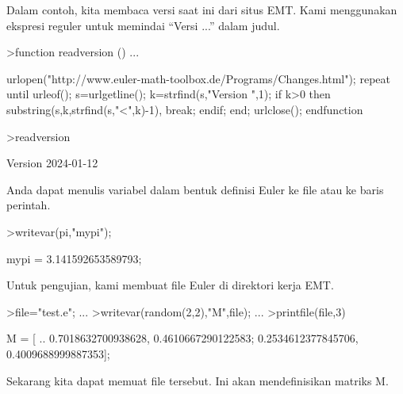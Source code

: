 \documentclass[a4paper,10pt]{article}
\begin{document}
\begin{eulernotebook}
\begin{eulercomment}
\begin{eulercomment}
\begin{eulercomment}
\begin{eulercomment}
\begin{eulercomment}
\begin{eulercomment}
\begin{eulercomment}
\begin{eulercomment}
\begin{eulercomment}
\begin{eulercomment}
\begin{eulercomment}
\begin{eulercomment}
\begin{eulercomment}
\begin{eulercomment}
\begin{eulercomment}
\begin{eulercomment}
\begin{eulercomment}
\begin{eulercomment}
\begin{eulercomment}
\begin{eulercomment}
\begin{eulercomment}
\begin{eulercomment}
\begin{eulercomment}
\begin{eulercomment}
\begin{eulercomment}
Dalam contoh, kita membaca versi saat ini dari situs EMT. Kami
menggunakan ekspresi reguler untuk memindai “Versi ...” dalam judul.
\end{eulercomment}
\begin{eulerprompt}
>function readversion () ...
\end{eulerprompt}
\begin{eulerudf}
  urlopen("http://www.euler-math-toolbox.de/Programs/Changes.html");
  repeat
    until urleof();
    s=urlgetline();
    k=strfind(s,"Version ",1);
    if k>0 then substring(s,k,strfind(s,"<",k)-1), break; endif;
  end;
  urlclose();
  endfunction
\end{eulerudf}
\begin{eulerprompt}
>readversion
\end{eulerprompt}
\begin{euleroutput}
  Version 2024-01-12
\end{euleroutput}
\begin{eulercomment}
Anda dapat menulis variabel dalam bentuk definisi Euler ke file atau
ke baris perintah.
\end{eulercomment}
\begin{eulerprompt}
>writevar(pi,"mypi");
\end{eulerprompt}
\begin{euleroutput}
  mypi = 3.141592653589793;
\end{euleroutput}
\begin{eulercomment}
Untuk pengujian, kami membuat file Euler di direktori kerja EMT.
\end{eulercomment}
\begin{eulerprompt}
>file="test.e"; ...
>writevar(random(2,2),"M",file); ...
>printfile(file,3)
\end{eulerprompt}
\begin{euleroutput}
  M = [ ..
  0.7018632700938628, 0.4610667290122583;
  0.2534612377845706, 0.4009688999887353];
\end{euleroutput}
\begin{eulercomment}
Sekarang kita dapat memuat file tersebut. Ini akan mendefinisikan
matriks M.
\end{eulercomment}
\begin{eulerprompt}

\end{eulerprompt}
\end{eulercomment}
\end{eulercomment}
\end{eulercomment}
\end{eulercomment}
\end{eulercomment}
\end{eulercomment}
\end{eulercomment}
\end{eulercomment}
\end{eulercomment}
\end{eulercomment}
\end{eulercomment}
\end{eulercomment}
\end{eulercomment}
\end{eulercomment}
\end{eulercomment}
\end{eulercomment}
\end{eulercomment}
\end{eulercomment}
\end{eulercomment}
\end{eulercomment}
\end{eulercomment}
\end{eulercomment}
\end{eulercomment}
\end{eulercomment}
\end{eulernotebook}
\end{document}
